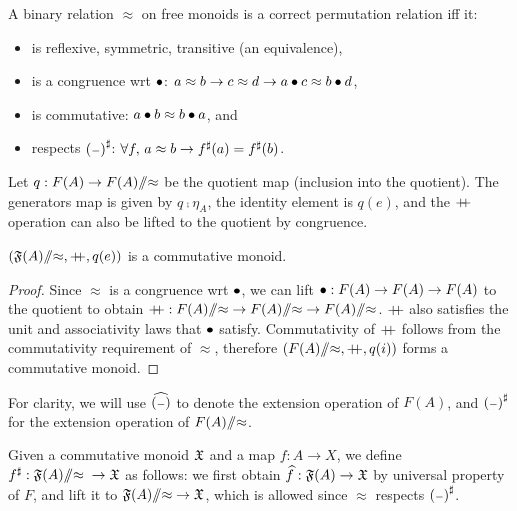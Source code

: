 
\begin{definition}
    \label{def:permutation-relation}
    \leavevmode
    A binary relation $\approx$ on free monoids is a correct permutation relation iff it:
    \begin{itemize}
        \item is reflexive, symmetric, transitive (an equivalence),
        \item is a congruence wrt $\mathbin{\bullet}$: $a \approx b \to c \approx d \to a \mathbin{\bullet} c \approx b \mathbin{\bullet} d$,
        \item is commutative: $a \mathbin{\bullet} b \approx b \mathbin{\bullet} a$, and
        \item respects $\ext{(\blank)}$: $\forall f, \, a \approx b \to {f}^{\sharp}(a) = {f}^{\sharp}(b)$.
    \end{itemize}
\end{definition}

Let $q : F(A) \to {F(A)}{\sslash}{\approx}$ be the quotient map (inclusion into the quotient).
%
The generators map is given by $q \comp \eta_A$, the identity element is $q(e)$,
and the $\mathbin{+\kern -0.4em+}$ operation can also be lifted to the quotient by congruence.

\begin{proposition}
    $({\mathfrak{F}(A)}{\sslash}{\approx}, \mathbin{+\kern -0.4em+}, q(e))$ is a commutative monoid.
\end{proposition}

\begin{proof}
    Since $\approx$ is a congruence wrt $\mathbin{\bullet}$,
    we can lift $\mathbin{\bullet} : F(A) \to F(A) \to F(A)$ to the quotient to obtain
    $\mathbin{+\kern -0.4em+} : {F(A)}{\sslash}{\approx} \to {F(A)}{\sslash}{\approx} \to {F(A)}{\sslash}{\approx}$.
    $\mathbin{+\kern -0.4em+}$ also satisfies the unit and associativity laws that $\mathbin{\bullet}$ satisfy.
    Commutativity of $\mathbin{+\kern -0.4em+}$ follows from the commutativity requirement of $\approx$,
    therefore $({F(A)}{\sslash}{\approx}, \mathbin{+\kern -0.4em+}, q(i))$ forms a commutative monoid.
\end{proof}

For clarity, we will use $\exthat{(\blank)}$ to denote the extension operation of $F(A)$,
and $\ext{(\blank)}$ for the extension operation of ${F(A)}{\sslash}{\approx}$.

\begin{definition}
    Given a commutative monoid $\mathfrak{X}$ and a map $f : A \to X$,
    we define
    ${f}^{\sharp} : {\mathfrak{F}(A)}{\sslash}{\approx} \; \to \mathfrak{X}$ as follows:
    we first obtain $\widehat{f} : \mathfrak{F}(A) \to \mathfrak{X}$ by universal property of $F$, and lift it
    to ${\mathfrak{F}(A)}{\sslash}{\approx} \to \mathfrak{X}$, which is allowed since $\approx$ respects $\ext{(\blank)}$.
\end{definition}

